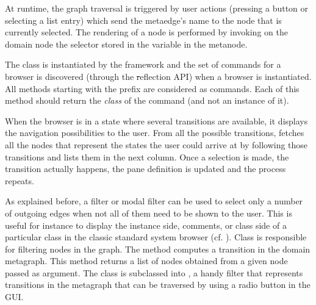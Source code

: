 \documentclass[a4paper,10pt,twoside]{book}
\begin{document}
At runtime, the graph traversal is triggered by user actions (\eg pressing a button or selecting a list entry) which send the metaedge's name to the node that is currently selected. The rendering of a node is performed by invoking on the domain node the selector stored in the variable  in the metanode.

The class  is instantiated by the framework and the set of commands for a browser is discovered (through the \st reflection API) when a browser is instantiated. All methods starting with the  prefix are considered as commands. Each of this method should return the \emph{class} of the command (and not an instance of it).


When the browser is in a state where several transitions are available, it displays the navigation possibilities to the user. From all the possible transitions, \obf fetches all the nodes that represent the states the user could arrive at by following those transitions and lists them in the next column. Once a selection is made, the transition  actually happens, the pane definition is updated and the process repeats.

As explained before, a filter or modal filter can be used to select only a number of outgoing edges when not all of them need to be shown to the user. This is useful for instance to display the instance side, comments, or class side of a particular class in the classic standard system browser (cf. ). Class  is responsible for filtering nodes in the graph. The method  computes a transition in the domain metagraph. This method returns a list of nodes obtained from a given node passed as argument. The class  is subclassed into , a handy filter that represents transitions in the metagraph that can be traversed by using a radio button in the GUI.
\end{document}
